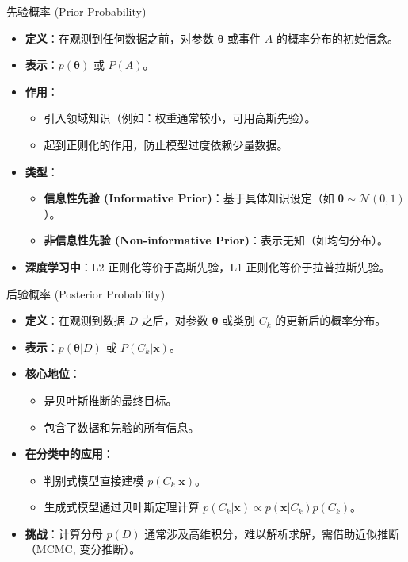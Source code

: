 \documentclass[12pt, aspectratio=169]{beamer}
\newcommand{\vect}[1]{\mathbf{#1}}
\newcommand{\N}{\mathcal{N}}
\begin{document}
\begin{frame}{先验概率 (Prior Probability)}
    \begin{itemize}
        \item \textbf{定义}：在观测到任何数据之前，对参数 $\boldsymbol{\theta}$ 或事件 $A$ 的概率分布的初始信念。
        \item \textbf{表示}：$p(\boldsymbol{\theta})$ 或 $P(A)$。
        \item \textbf{作用}：
        \begin{itemize}
            \item 引入领域知识（例如：权重通常较小，可用高斯先验）。
            \item 起到正则化的作用，防止模型过度依赖少量数据。
        \end{itemize}
        \item \textbf{类型}：
        \begin{itemize}
            \item \textbf{信息性先验 (Informative Prior)}：基于具体知识设定（如 $\boldsymbol{\theta} \sim \N(0, 1)$）。
            \item \textbf{非信息性先验 (Non-informative Prior)}：表示无知（如均匀分布）。
        \end{itemize}
        \item \textbf{深度学习中}：L2 正则化等价于高斯先验，L1 正则化等价于拉普拉斯先验。
    \end{itemize}
\end{frame}

\begin{frame}{后验概率 (Posterior Probability)}
    \begin{itemize}
        \item \textbf{定义}：在观测到数据 $D$ 之后，对参数 $\boldsymbol{\theta}$ 或类别 $C_k$ 的更新后的概率分布。
        \item \textbf{表示}：$p(\boldsymbol{\theta}|D)$ 或 $P(C_k|\vect{x})$。
        \item \textbf{核心地位}：
        \begin{itemize}
            \item 是贝叶斯推断的最终目标。
            \item 包含了数据和先验的所有信息。
        \end{itemize}
        \item \textbf{在分类中的应用}：
        \begin{itemize}
            \item 判别式模型直接建模 $p(C_k|\vect{x})$。
            \item 生成式模型通过贝叶斯定理计算 $p(C_k|\vect{x}) \propto p(\vect{x}|C_k)p(C_k)$。
        \end{itemize}
        \item \textbf{挑战}：计算分母 $p(D)$ 通常涉及高维积分，难以解析求解，需借助近似推断（MCMC, 变分推断）。
    \end{itemize}
\end{frame}
\end{document}
